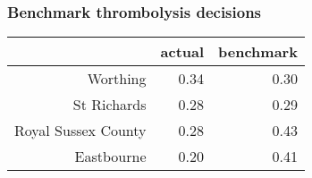 

\begin{frame}
\frametitle{Benchmark thrombolysis decisions}


\begin{table}[]
\begin{tabular}{rrr}
                            & actual & benchmark \\
\hline
Worthing                    & 0.34   & 0.30      \\
St Richards                 & 0.28   & 0.29     \\
Royal Sussex County         & 0.28   & 0.43     \\
Eastbourne                  & 0.20   & 0.41
\end{tabular}
\end{table}

\end{frame}